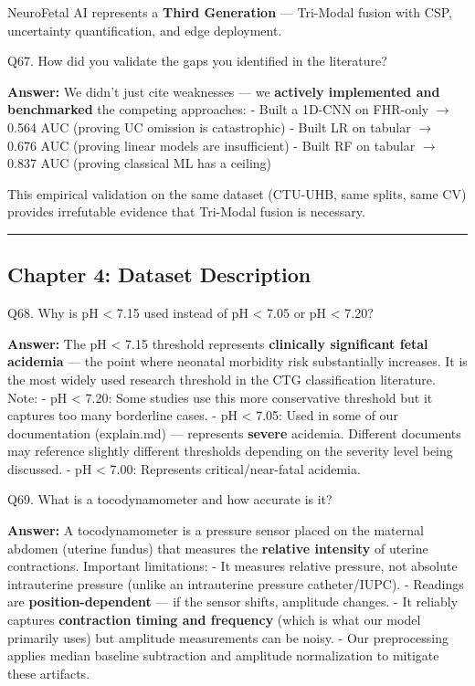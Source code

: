 \documentclass[11pt,a4paper]{article}
\begin{document}
NeuroFetal AI represents a \textbf{Third Generation} --- Tri-Modal
fusion with CSP, uncertainty quantification, and edge deployment.

\begin{questionbox}
Q67. How did you validate the gaps you identified in the
literature?
\end{questionbox}
\textbf{Answer:} We didn't just cite weaknesses --- we \textbf{actively
implemented and benchmarked} the competing approaches: - Built a 1D-CNN
on FHR-only $\rightarrow$ 0.564 AUC (proving UC omission is catastrophic) - Built LR
on tabular $\rightarrow$ 0.676 AUC (proving linear models are insufficient) - Built
RF on tabular $\rightarrow$ 0.837 AUC (proving classical ML has a ceiling)

This empirical validation on the same dataset (CTU-UHB, same splits,
same CV) provides irrefutable evidence that Tri-Modal fusion is
necessary.

\begin{center}\rule{0.5\linewidth}{0.5pt}\end{center}

\subsection{Chapter 4: Dataset
Description}\label{chapter-4-dataset-description}

\begin{questionbox}
Q68. Why is pH \textless{} 7.15 used instead of pH \textless{}
7.05 or pH \textless{} 7.20?
\end{questionbox}
\textbf{Answer:} The pH \textless{} 7.15 threshold represents
\textbf{clinically significant fetal acidemia} --- the point where
neonatal morbidity risk substantially increases. It is the most widely
used research threshold in the CTG classification literature. Note: - pH
\textless{} 7.20: Some studies use this more conservative threshold but
it captures too many borderline cases. - pH \textless{} 7.05: Used in
some of our documentation (explain.md) --- represents \textbf{severe}
acidemia. Different documents may reference slightly different
thresholds depending on the severity level being discussed. - pH
\textless{} 7.00: Represents critical/near-fatal acidemia.

\begin{questionbox}
Q69. What is a tocodynamometer and how accurate is it?
\end{questionbox}
\textbf{Answer:} A tocodynamometer is a pressure sensor placed on the
maternal abdomen (uterine fundus) that measures the \textbf{relative
intensity} of uterine contractions. Important limitations: - It measures
relative pressure, not absolute intrauterine pressure (unlike an
intrauterine pressure catheter/IUPC). - Readings are
\textbf{position-dependent} --- if the sensor shifts, amplitude changes.
- It reliably captures \textbf{contraction timing and frequency} (which
is what our model primarily uses) but amplitude measurements can be
noisy. - Our preprocessing applies median baseline subtraction and
amplitude normalization to mitigate these artifacts.
\end{document}
